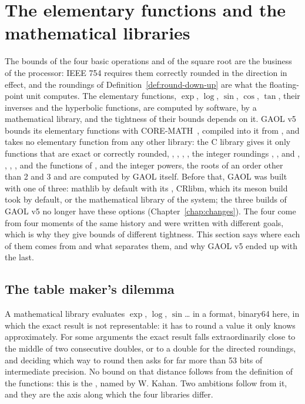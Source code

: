 \section[The elementary functions and the mathematical libraries]{The elementary functions and the\\ mathematical libraries}
\label{sec:math-libraries}
%
%

The bounds of the four basic operations and of the square root are the
business of the processor: IEEE 754 requires them correctly rounded in the
direction in effect, and the roundings of Definition~\ref{def:round-down-up}
are what the floating-point unit computes. The elementary functions,
$\exp$, $\log$, $\sin$, $\cos$, $\tan$, their inverses and the hyperbolic
functions, are computed by software, by a mathematical library, and the
tightness of their bounds depends on it. GAOL v5 bounds its
elementary functions with CORE-MATH~\cite{CoreMath:2022}, compiled into it
from , and takes no elementary function from any other
library: the C library gives it only functions that are exact or correctly
rounded, , , , , the integer roundings ,
,  and , , ,
,  and the functions of , and the
integer powers, the roots of an order other than 2 and 3 and
 are computed by GAOL itself. Before that, GAOL was built with
one of three: mathlib by default with its , CRlibm, which its
meson build took by default, or the mathematical library of the system; the
three builds of GAOL v5 no longer have these options (Chapter~\ref{chap:changes}).\newinvfive{} The
four come from four moments of the same history and were written with
different goals, which is why they give bounds of different tightness. This
section says where each of them comes from and what separates them, and why
GAOL v5 ended up with the last.

\subsection{The table maker's dilemma}
%
%

A mathematical library evaluates $\exp$, $\log$, $\sin$\ldots{} in a
format, binary64 here, in which the exact result is not representable: it
has to round a value it only knows approximately. For some arguments the
exact result falls extraordinarily close to the middle of two consecutive
doubles, or to a double for the directed roundings, and deciding which way to round then asks for far more than 53
bits of intermediate precision. No bound on that distance follows from the
definition of the functions: this is the , named
by W. Kahan. Two ambitions follow from it, and they are the axis along
which the four libraries differ.

